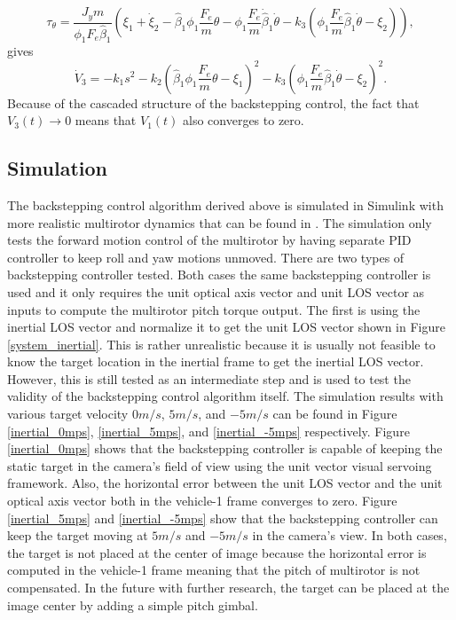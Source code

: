 \begin{equation}
\tau_\theta=\frac{J_ym}{\phi_1F_e\hat{\beta}_1}
(\xi_1+\dot{\xi}_2-\hat{\beta}_1\phi_1\frac{F_e}{m}\theta-\phi_1\frac{F_e}{m}\dot{\hat{\beta}}_1\dot{\theta}-k_3(\phi_1\frac{F_e}{m}\hat{\beta}_1\dot{\theta}-\xi_2)),
\end{equation}
gives
\begin{equation}
\dot{V}_3=-k_1s^2-k_2(\hat{\beta}_1\phi_1\frac{F_e}{m}\theta-\xi_1)^2-k_3(\phi_1\frac{F_e}{m}\hat{\beta}_1\dot{\theta}-\xi_2)^2.
\end{equation}
Because of the cascaded structure of the backstepping control, the fact that $V_3(t)\rightarrow 0$ means that $V_1(t)$ also converges to zero.

\subsection{Simulation}
The backstepping control algorithm derived above is simulated in Simulink with more realistic multirotor dynamics that can be found in {\cite{Beard2008}}. The simulation only tests the forward motion control of the multirotor by having separate PID controller to keep roll and yaw motions unmoved. There are two types of backstepping controller tested. Both cases the same backstepping controller is used and it only requires the unit optical axis vector and unit LOS vector as inputs to compute the multirotor pitch torque output. The first is using the inertial LOS vector and normalize it to get the unit LOS vector shown in Figure \ref{system_inertial}. This is rather unrealistic because it is usually not feasible to know the target location in the inertial frame to get the inertial LOS vector. However, this is still tested as an intermediate step and is used to test the validity of the backstepping control algorithm itself. The simulation results with various target velocity $0m/s$, $5m/s$, and $-5m/s$ can be found in Figure \ref{inertial_0mps}, \ref{inertial_5mps}, and \ref{inertial_-5mps} respectively. Figure \ref{inertial_0mps} shows that the backstepping controller is capable of keeping the static target in the camera's field of view using the unit vector visual servoing framework. Also, the horizontal error between the unit LOS vector and the unit optical axis vector both in the vehicle-1 frame converges to zero. Figure \ref{inertial_5mps} and \ref{inertial_-5mps} show that the backstepping controller can keep the target moving at $5m/s$ and $-5m/s$ in the camera's view. In both cases, the target is not placed at the center of image because the horizontal error is computed in the vehicle-1 frame meaning that the pitch of multirotor is not compensated. In the future with further research, the target can be placed at the image center by adding a simple pitch gimbal. 
